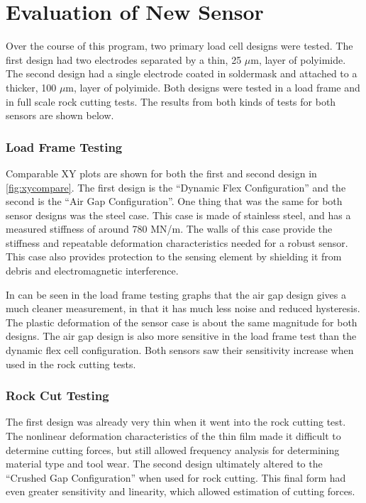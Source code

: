 \chapter{Evaluation of New Sensor
\label{chap:8}}

Over the course of this program, two primary load cell designs were tested.
The first design had two electrodes separated by a thin, 25 $\mu$m, layer of polyimide.
The second design had a single electrode coated in soldermask 
and attached to a thicker, 100 $\mu$m, layer of polyimide.
Both designs were tested in a load frame and in full scale rock cutting tests.
The results from both kinds of tests for both sensors are shown below.

\subsection{Load Frame Testing}

Comparable XY plots are shown for both the first and second design
in \ref{fig:xycompare}. The first design is the ``Dynamic Flex Configuration'' 
and the second is the ``Air Gap Configuration''.
One thing that was the same for both sensor designs was the steel case. This case
is made of stainless steel, and has a measured stiffness of around 780 MN/m. 
The walls of this case provide the stiffness and repeatable deformation characteristics
needed for a robust sensor. This case also provides protection to the sensing element by
shielding it from debris and electromagnetic interference.

In can be seen in the load frame testing graphs that the air gap design
gives a much cleaner measurement, in that it has much less noise and reduced hysteresis.
The plastic deformation of the sensor case is about the same magnitude for both designs.
The air gap design is also more sensitive in the load frame test than the dynamic flex cell configuration.
Both sensors saw their sensitivity increase when used in the rock cutting tests.

\subsection{Rock Cut Testing}

The first design was already very thin when it went into the rock cutting test.
The nonlinear deformation characteristics of the thin film made it difficult to determine
cutting forces, but still allowed frequency analysis for determining material type and tool wear.
The second design ultimately altered to the ``Crushed Gap Configuration'' when used for rock cutting.
This final form had even greater sensitivity and linearity, which allowed estimation of cutting forces.

